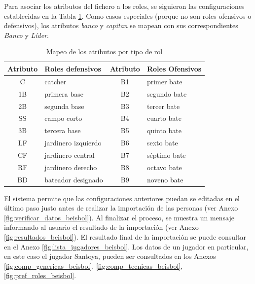 Para asociar los atributos del fichero a los roles, se siguieron las configuraciones establecidas en la Tabla \ref{mapeo-tipo-roles}. Como casos especiales (porque no son roles ofensivos o defensivos), los atributos \textit{banco} y \textit{capitan} se mapean con sus correspondientes \textit{Banco} y \textit{Líder}.

\begin{table}[H]
	\centering
	\caption{Mapeo de los atributos por tipo de rol}\label{mapeo-tipo-roles}
		\begin{tabular}{c l c l}
			\toprule
			\textbf{Atributo} & \textbf{Roles defensivos} & \textbf{Atributo} & \textbf{Roles Ofensivos} \\ \midrule
			C                 & catcher                   & B1                & primer bate              \\
			1B          & primera base              & B2                & segundo bate             \\
			2B          & segunda base              & B3                & tercer bate              \\
			SS                & campo corto               & B4                & cuarto bate              \\
			3B          & tercera base              & B5                & quinto bate              \\
			LF                & jardinero izquierdo       & B6                & sexto bate               \\
			CF                & jardinero central         & B7                & séptimo bate             \\
			RF                & jardinero derecho         & B8                & octavo bate              \\
			BD                & bateador designado        & B9                & noveno bate              \\ \bottomrule
		\end{tabular}
\end{table}


El sistema permite que las configuraciones anteriores puedan se editadas en el último paso justo antes de realizar la importación de las personas (ver Anexo \ref{fig:verificar_datos_beisbol}). Al finalizar el proceso, se muestra un mensaje informando al usuario el resultado de la importación (ver Anexo \ref{fig:resultados_beisbol}). El resultado final de la importación se puede consultar en el Anexo \ref{fig:lista_jugadores_beisbol}. Los datos de un jugador en particular, en este caso el jugador Santoya, pueden ser consultados en los Anexos \ref{fig:comp_genericas_beisbol}, \ref{fig:comp_tecnicas_beisbol}, \ref{fig:pref_roles_beisbol}.

